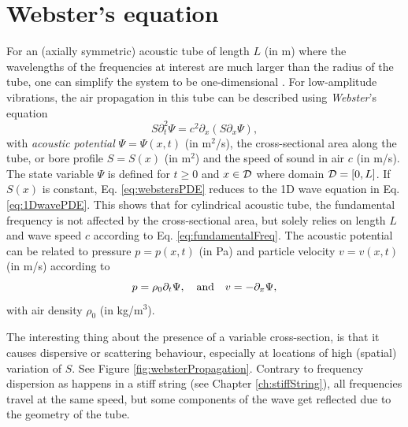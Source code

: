 \section{Webster's equation}\label{sec:webstersEq}
For an (axially symmetric) acoustic tube of length $L$ (in m) where the wavelengths of the frequencies at interest are much larger than the radius of the tube, one can simplify the system to be one-dimensional \cite{Bilbao2018}. For low-amplitude vibrations, the air propagation in this tube can be described using \textit{Webster}'s equation \cite{Webster1919}
\begin{equation}\label{eq:webstersPDE}
    S\partial_t^2\Psi = c^2\partial_x(S\partial_x\Psi),
\end{equation}
with \textit{acoustic potential} $\Psi = \Psi(x,t)$ (in m$^2$/s), the cross-sectional area along the tube, or bore profile $S = S(x)$ (in m$^2$) and the speed of sound in air $c$ (in m/s). The state variable $\Psi$ is defined for $t\geq 0$ and $x \in \mathcal{D}$ where domain $\mathcal{D} = [0, L]$. If $S(x)$ is constant, Eq. \eqref{eq:webstersPDE} reduces to the 1D wave equation in Eq. \eqref{eq:1DwavePDE}. This shows that for cylindrical acoustic tube, the fundamental frequency is not affected by the cross-sectional area, but solely relies on length $L$ and wave speed $c$ according to Eq. \eqref{eq:fundamentalFreq}. The acoustic potential can be related to pressure $p = p(x,t)$ (in Pa) and particle velocity $v = v(x,t)$ (in m/s) according to \cite{Bilbao2018}
\begin{equation}\label{eq:pressureVelocityWebster}
    p = \rho_0 \partial_t \Psi, \quad \text{and} \quad v = -\partial_x \Psi,
\end{equation}
with air density $\rho_0$ (in kg/m$^3$).

The interesting thing about the presence of a variable cross-section, is that it causes dispersive or scattering behaviour, especially at locations of high (spatial) variation of $S$. See Figure \ref{fig:websterPropagation}. Contrary to frequency dispersion as happens in a stiff string (see Chapter \ref{ch:stiffString}), all frequencies travel at the same speed, but some components of the wave get reflected due to the geometry of the tube.

